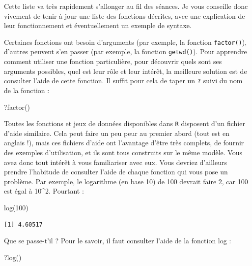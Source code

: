 \documentclass[
  letterpaper,
  DIV=11,
  numbers=noendperiod]{scrreprt}
\newenvironment{Shaded}{\begin{snugshade}}{\end{snugshade}}
\newcommand{\DecValTok}[1]{\textcolor[rgb]{0.68,0.00,0.00}{#1}}
\newcommand{\FunctionTok}[1]{\textcolor[rgb]{0.28,0.35,0.67}{#1}}
\newcommand{\NormalTok}[1]{\textcolor[rgb]{0.00,0.23,0.31}{#1}}
\begin{document}
Cette liste va très rapidement s'allonger au fil des séances. Je vous
conseille donc vivement de tenir à jour une liste des fonctions
décrites, avec une explication de leur fonctionnement et éventuellement
un exemple de syntaxe.

Certaines fonctions ont besoin d'arguments (par exemple, la fonction
\texttt{factor()}), d'autres peuvent s'en passer (par exemple, la
fonction \texttt{getwd()}). Pour apprendre comment utiliser une fonction
particulière, pour découvrir quels sont ses arguments possibles, quel
est leur rôle et leur intérêt, la meilleure solution est de consulter
l'aide de cette fonction. Il suffit pour cela de taper un \texttt{?}
suivi du nom de la fonction :

\begin{Shaded}
\begin{Highlighting}[]
\NormalTok{?}\FunctionTok{factor}\NormalTok{()}
\end{Highlighting}
\end{Shaded}

Toutes les fonctions et jeux de données disponibles dans \texttt{R}
disposent d'un fichier d'aide similaire. Cela peut faire un peu peur au
premier abord (tout est en anglais !), mais ces fichiers d'aide ont
l'avantage d'être très complets, de fournir des exemples d'utilisation,
et ils sont tous construits sur le même modèle. Vous avez donc tout
intérêt à vous familiariser avec eux. Vous devriez d'ailleurs prendre
l'habitude de consulter l'aide de chaque fonction qui vous pose un
problème. Par exemple, le logarithme (en base 10) de 100 devrait faire
2, car 100 est égal à 10\^{}2. Pourtant :

\begin{Shaded}
\begin{Highlighting}[]
\FunctionTok{log}\NormalTok{(}\DecValTok{100}\NormalTok{)}
\end{Highlighting}
\end{Shaded}

\begin{verbatim}
[1] 4.60517
\end{verbatim}

Que se passe-t'il ? Pour le savoir, il faut consulter l'aide de la
fonction log :

\begin{Shaded}
\begin{Highlighting}[]
\NormalTok{?}\FunctionTok{log}\NormalTok{()}
\end{Highlighting}
\end{Shaded}
\end{document}
